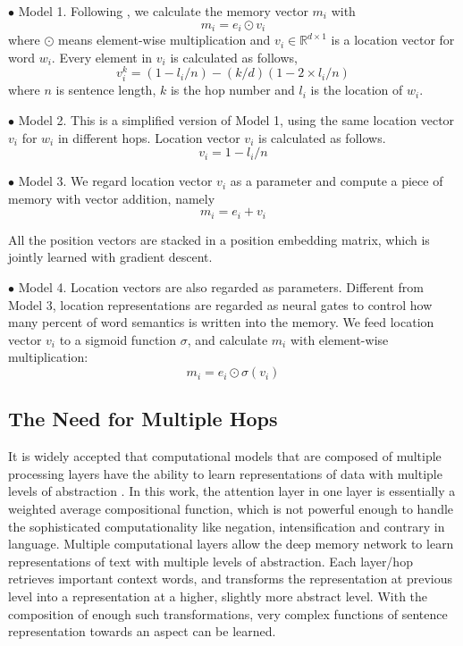 \documentclass[11pt,letterpaper]{article}
\begin{document}
$\bullet$ {Model 1}. Following , we calculate the memory vector $m_i$ with 
\begin{equation}
m_i = e_i \odot v_{i}
\end{equation}
where $\odot$ means element-wise multiplication and $v_{i} \in \mathbb{R}^{d \times 1}$ is a location vector for word $w_i$. 
Every element in $v_i$ is calculated as follows,
\begin{equation}
	v_{i}^{k} = (1 - l_i/n) - (k/d) (1 - 2 \times l_i/n)
\end{equation}
where $n$ is sentence length,  $k$ is the hop number and $l_i$ is the location of $w_i$. 



$\bullet$ {Model 2}. This is a simplified version of Model 1, using the same location vector $v_i$ for $w_i$ in different hops.
Location vector $v_i$ is calculated as follows.
\begin{equation}
v_{i} = 1 - l_i/n
\end{equation}

$\bullet$ {Model 3}. We regard location vector $v_i$ as a parameter and compute a piece of memory with vector addition, namely 
\begin{equation}
m_i = e_i + v_i
\end{equation}

All the position vectors are stacked in a position embedding matrix, which is jointly learned with gradient descent.

$\bullet$ {Model 4}. Location vectors are also regarded as parameters. 
Different from Model 3, location representations are regarded as neural gates to control how many percent of word semantics is written into the memory. We feed location vector $v_i$ to a sigmoid function $\sigma$, and calculate $m_i$ with element-wise multiplication: 
\begin{equation}
m_i = e_i \odot \sigma(v_i)
\end{equation}

\subsection{The Need for Multiple Hops}
It is widely accepted that computational models that are composed of multiple processing layers have the ability to learn representations of data with multiple levels of abstraction \cite{LeCun2015}.
In this work, the attention layer in one layer is essentially a weighted average compositional function, which is not powerful enough to handle the sophisticated computationality like negation, intensification and contrary in language.
Multiple computational layers allow the deep memory network to learn representations of text with multiple levels of abstraction. Each layer/hop retrieves important context words, and transforms the representation at previous level into a representation at a higher, slightly more abstract level. With the composition of enough such transformations, very complex functions of sentence representation towards an aspect can be learned.
\end{document}
